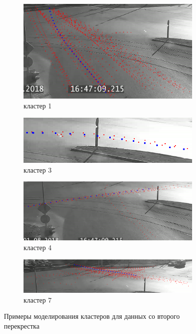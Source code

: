 \begin{figure}[!htb]
	\centering
	\begin{subfigure}[!htb]{0.7\textwidth}
		\centering{}
		\includegraphics[width=\textwidth]{images/cm-1-from-8-0_95.png}
		\caption{кластер 1}
	\end{subfigure}
	\hfill
	\begin{subfigure}[!htb]{0.7\textwidth}
		\centering{}
		\includegraphics[width=\textwidth]{images/cm-3-from-8-0_95.png}
		\caption{кластер 3}
	\end{subfigure}
	\hfill
	\begin{subfigure}[!htb]{0.7\textwidth}
		\centering{}
		\includegraphics[width=\textwidth]{images/cm-4-from-8-0_95.png}
		\caption{кластер 4}
	\end{subfigure}
	\hfill
	\begin{subfigure}[!htb]{0.7\textwidth}
		\centering{}
		\includegraphics[width=\textwidth]{images/cm-7-from-8-0_95.png}
		\caption{кластер 7}
	\end{subfigure}
	
	\caption{Примеры моделирования кластеров для данных со второго перекрестка}
	\label{fig:cm-res}
\end{figure}
